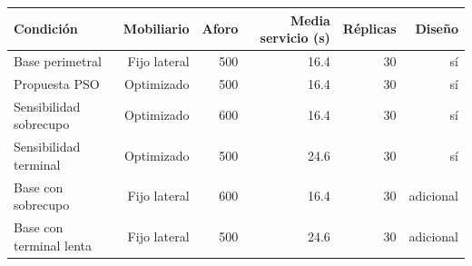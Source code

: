 \begin{tabular}{lrrrrr}
\toprule
Condición & Mobiliario & Aforo & Media servicio (s) & Réplicas & Diseño \\
\midrule
Base perimetral & Fijo lateral & 500 & 16.4 & 30 & sí \\
Propuesta PSO & Optimizado & 500 & 16.4 & 30 & sí \\
Sensibilidad sobrecupo & Optimizado & 600 & 16.4 & 30 & sí \\
Sensibilidad terminal & Optimizado & 500 & 24.6 & 30 & sí \\
Base con sobrecupo & Fijo lateral & 600 & 16.4 & 30 & adicional \\
Base con terminal lenta & Fijo lateral & 500 & 24.6 & 30 & adicional \\
\bottomrule
\end{tabular}
